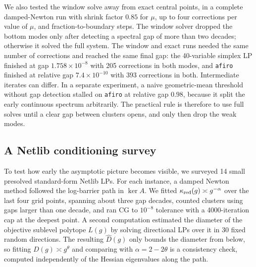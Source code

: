We also tested the window solve away from exact central points, in a
complete damped-Newton run with shrink factor $0.85$ for $\mu$, up to four
corrections per value of $\mu$, and fraction-to-boundary steps.  The window
solver dropped the bottom modes only after detecting a spectral gap of more
than two decades; otherwise it solved the full system.  The window and exact
runs needed the same number of corrections and reached the same final gap:
the 40-variable simplex LP finished at gap $1.758\times10^{-8}$ with
205 corrections in both modes, and \texttt{afiro} finished at relative gap
$7.4\times10^{-10}$ with 393 corrections in both.  Intermediate iterates can
differ.  In a separate experiment, a naive geometric-mean threshold without
gap detection stalled on \texttt{afiro} at relative gap $0.98$, because it
split the early continuous spectrum arbitrarily.  The practical rule is
therefore to use full solves until a clear gap between clusters opens, and
only then drop the weak modes.

\subsection{A Netlib conditioning survey}
\label{sec:spectra-netlib}

To test how early the asymptotic picture becomes visible, we surveyed 14
small presolved standard-form Netlib LPs.  For each instance, a damped Newton
method followed the log-barrier path in $\ker A$.  We fitted
$\kappa_{\rm red}(g)\asymp g^{-\alpha}$ over the last four grid points,
spanning about three gap decades, counted clusters using gaps larger than
one decade, and ran CG to $10^{-8}$ tolerance with a 4000-iteration cap at
the deepest point.  A second computation estimated the diameter of the
objective sublevel polytope $L(g)$ by solving directional LPs over it in 30
fixed random directions.  The resulting $\widehat D(g)$ only bounds the
diameter from below, so fitting $\widehat D(g)\asymp g^\theta$ and comparing
with $\alpha=2-2\theta$ is a consistency check, computed independently of
the Hessian eigenvalues along the path.

